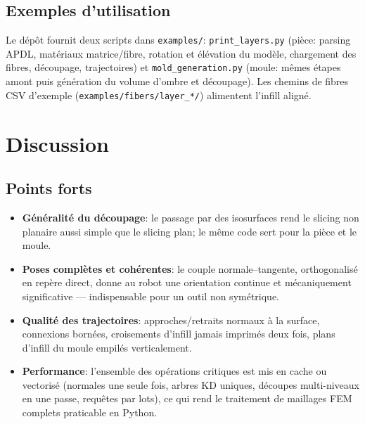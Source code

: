 \documentclass[11pt,a4paper]{article}
\begin{document}
\subsection{Exemples d'utilisation}
Le dépôt fournit deux scripts dans \texttt{examples/}:
\texttt{print\_layers.py} (pièce: parsing APDL, matériaux matrice/fibre,
rotation et élévation du modèle, chargement des fibres, découpage,
trajectoires) et \texttt{mold\_generation.py} (moule: mêmes étapes
amont puis génération du volume d'ombre et découpage). Les chemins de
fibres CSV d'exemple (\texttt{examples/fibers/layer\_*/}) alimentent
l'infill aligné.

\section{Discussion}\label{sec:discussion}

\subsection{Points forts}
\begin{itemize}
  \item \textbf{Généralité du découpage}: le passage par des
        isosurfaces rend le slicing non planaire aussi simple que le
        slicing plan; le même code sert pour la pièce et le moule.
  \item \textbf{Poses complètes et cohérentes}: le couple
        normale--tangente, orthogonalisé en repère direct, donne au
        robot une orientation continue et mécaniquement significative
        --- indispensable pour un outil non symétrique.
  \item \textbf{Qualité des trajectoires}: approches/retraits normaux à
        la surface, connexions bornées, croisements d'infill jamais
        imprimés deux fois, plans d'infill du moule empilés
        verticalement.
  \item \textbf{Performance}: l'ensemble des opérations critiques est
        mis en cache ou vectorisé (normales une seule fois, arbres KD
        uniques, découpes multi-niveaux en une passe, requêtes par
        lots), ce qui rend le traitement de maillages FEM complets
        praticable en Python.
\end{itemize}
\end{document}
